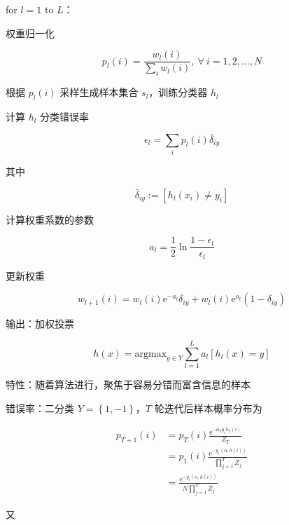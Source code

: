 \documentclass[openany,a4paper,12pt]{ctexbook}
\theoremstyle{kaiti}
\theoremstyle{normal}
\begin{document}
for $l=1$ to $L$：

权重归一化

\begin{equation}
p_l(i)=\frac{w_l(i)}{\displaystyle\sum_iw_l(i)},~\forall~i=1,2,\dots ,N
\end{equation}

根据 $p_l(i)$ 采样生成样本集合 $s_l$，训练分类器 $h_l$

计算 $h_l$ 分类错误率

\begin{equation}
\epsilon_l=\sum_ip_l(i)\bar{\delta}_{iy}
\end{equation}

其中

\begin{equation}
\bar{\delta}_{iy}:=\left[h_l\left(x_i \right)\ne y_i \right]
\end{equation}

计算权重系数的参数

\begin{equation}
a_l=\frac{1}{2}\ln\frac{1-\epsilon_l}{\epsilon_l}
\end{equation}

更新权重

\begin{equation}
w_{l+1}(i)=w_l(i)\mathrm{e}^{-a_l}\delta_{iy}+w_l(i)\mathrm{e}^{a_l}(1-\delta_{iy})
\end{equation}

输出：加权投票

\begin{equation}
h(x)=\mathrm{argmax}_{y\in Y}\sum_{l=1}^{L}a_l[h_l(x)=y]
\end{equation}

特性：随着算法进行，聚焦于容易分错而富含信息的样本

错误率：二分类 $Y=\left\{ 1,-1 \right\}$，$T$ 轮迭代后样本概率分布为

\begin{equation}
\begin{aligned}
  p_{T+1}(i)
  &=p_T(i)\frac{\mathrm{e}^{-\alpha_Ty_ih_T(i)}}{Z_T}\\
  &=p_1(i)\frac{\mathrm{e}^{-y_i\left< \alpha ,h(i)\right>}}{\displaystyle\prod_{j=1}^{T}Z_j}\\
  &=\frac{\mathrm{e}^{-y_i\left< \alpha ,h(i)\right>}}{N\displaystyle\prod_{j=1}^{T}Z_j}
\end{aligned}
\end{equation}

又
\end{document}
